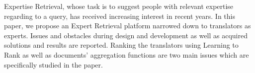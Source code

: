 Expertise Retrieval, whose task is to suggest people with relevant expertise regarding to a query, has received increasing interest in recent years. In this paper, we propose an Expert Retrieval platform narrowed down to translators as experts. Issues and obstacles during design and development as well as acquired solutions and results are reported. Ranking the translators using Learning to Rank as well as documents' aggregation functions are two main issues which are specifically studied in the paper.